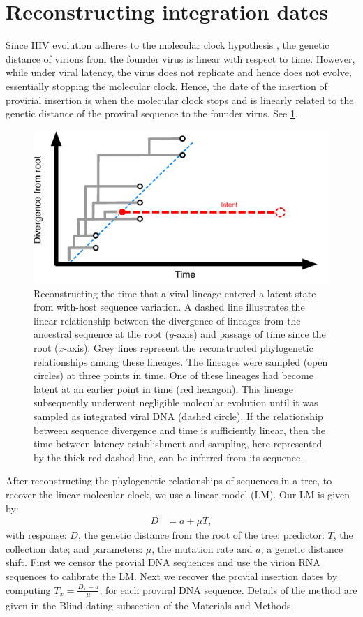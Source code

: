 \documentclass[9pt,twocolumn,twoside,lineno]{pnas-new}
\begin{document}
\section*{Reconstructing integration dates}
Since HIV evolution adheres to the molecular clock hypothesis \cite{Leitner99,Park16}, the genetic distance of virions from the founder virus is linear with respect to time.
However, while under viral latency, the virus does not replicate and hence does not evolve, essentially stopping the molecular clock.
Hence, the date of the insertion of provirial insertion is when the molecular clock stops and is linearly related to the genetic distance of the proviral sequence to the founder virus.
See \cref{fig:latenttree}.

\begin{figure}
\includegraphics{latency-scheme}
\caption{Reconstructing the time that a viral lineage entered a latent state from with-host sequence variation.
	A dashed line illustrates the linear relationship between the divergence of lineages from the ancestral sequence at the root ($y$-axis) and passage of time since the root ($x$-axis).
	Grey lines represent the reconstructed phylogenetic relationships among these lineages.
	The lineages were sampled (open circles) at three points in time.
	One of these lineages had become latent at an earlier point in time (red hexagon).
	This lineage subsequently underwent negligible molecular evolution until it was sampled as integrated viral DNA (dashed circle).
	If the relationship between sequence divergence and time is sufficiently linear, then the time between latency establishment and sampling, here represented by the thick red dashed line, can be inferred from its sequence.
}
\label{fig:latenttree}
\end{figure}

After reconstructing the phylogenetic relationships of sequences in a tree, to recover the linear molecular clock, we use a linear model (LM).
Our LM is given by:
\begin{align}
	D &= a + \mu T,\label{eq:glm}
\end{align}
with response: $D$, the genetic distance from the root of the tree; predictor: $T$, the collection date; and parameters: $\mu$, the mutation rate and $a$, a genetic distance shift.
First we censor the provial DNA sequences and use the virion RNA sequences to calibrate the LM.
Next we recover the provial insertion dates by computing $T_x = \frac{D_x - a}{\mu}$, for each proviral DNA sequence.
Details of the method are given in the Blind-dating subsection of the Materials and Methods.
\end{document}
